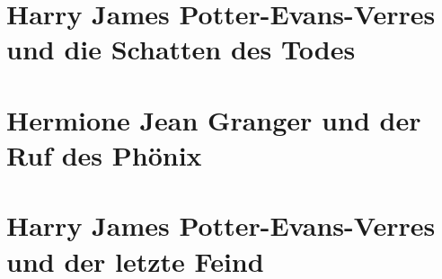 \part{Harry James Potter-Evans-Verres und die Schatten des Todes}

























\part{Hermione Jean Granger und der Ruf des Phönix}





















\part{Harry James Potter-Evans-Verres und der letzte Feind}















